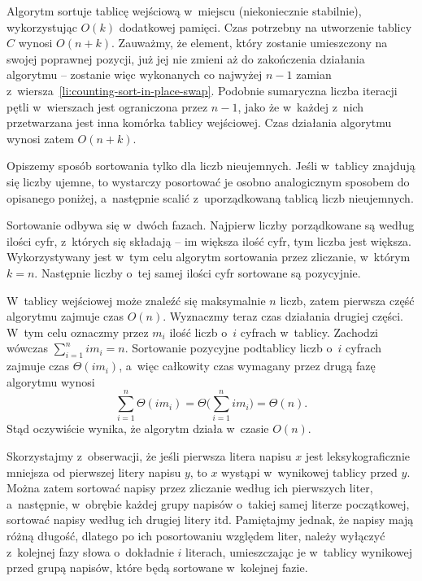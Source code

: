 Algorytm sortuje tablicę wejściową w~miejscu (niekoniecznie stabilnie), wykorzystując $O(k)$ dodatkowej pamięci.
Czas potrzebny na utworzenie tablicy $C$ wynosi $O(n+k)$.
Zauważmy, że element, który zostanie umieszczony na swojej poprawnej pozycji, już jej nie zmieni aż do zakończenia działania algorytmu -- zostanie więc wykonanych co najwyżej $n-1$ zamian z~wiersza~\ref{li:counting-sort-in-place-swap}.
Podobnie sumaryczna liczba iteracji pętli  w~wierszach \doubledash{\ref{li:counting-sort-in-place-while1-begin}}{\ref{li:counting-sort-in-place-while1-end}} jest ograniczona przez $n-1$, jako że w~każdej z~nich przetwarzana jest inna komórka tablicy wejściowej.
Czas działania algorytmu wynosi zatem $O(n+k)$.


\subproblem %
Opiszemy sposób sortowania tylko dla liczb nieujemnych.
Jeśli w~tablicy znajdują się liczby ujemne, to wystarczy posortować je osobno analogicznym sposobem do opisanego poniżej, a~następnie scalić z~uporządkowaną tablicą liczb nieujemnych.

Sortowanie odbywa się w~dwóch fazach.
Najpierw liczby porządkowane są według ilości cyfr, z~których się składają -- im większa ilość cyfr, tym liczba jest większa.
Wykorzystywany jest w~tym celu algorytm sortowania przez zliczanie, w~którym $k=n$.
Następnie liczby o~tej samej ilości cyfr sortowane są pozycyjnie.

W~tablicy wejściowej może znaleźć się maksymalnie $n$ liczb, zatem pierwsza część algorytmu zajmuje czas $O(n)$.
Wyznaczmy teraz czas działania drugiej części.
W~tym celu oznaczmy przez $m_i$ ilość liczb o~$i$ cyfrach w~tablicy.
Zachodzi wówczas $\sum_{i=1}^nim_i=n$.
Sortowanie pozycyjne podtablicy liczb o~$i$ cyfrach zajmuje czas $\Theta(im_i)$, a~więc całkowity czas wymagany przez drugą fazę algorytmu wynosi
\[
    \sum_{i=1}^n\Theta(im_i) = \Theta\biggl(\sum_{i=1}^nim_i\biggr) = \Theta(n).
\]
Stąd oczywiście wynika, że algorytm działa w~czasie $O(n)$.

\subproblem %
Skorzystajmy z~obserwacji, że jeśli pierwsza litera napisu $x$ jest leksykograficznie mniejsza od pierwszej litery napisu $y$, to $x$ wystąpi w~wynikowej tablicy przed $y$.
Można zatem sortować napisy przez zliczanie według ich pierwszych liter, a~następnie, w~obrębie każdej grupy napisów o~takiej samej literze początkowej, sortować napisy według ich drugiej litery itd.
Pamiętajmy jednak, że napisy mają różną długość, dlatego po ich posortowaniu względem  liter, należy wyłączyć z~kolejnej fazy słowa o~dokładnie $i$ literach, umieszczając je w~tablicy wynikowej przed grupą napisów, które będą sortowane w~kolejnej fazie.

